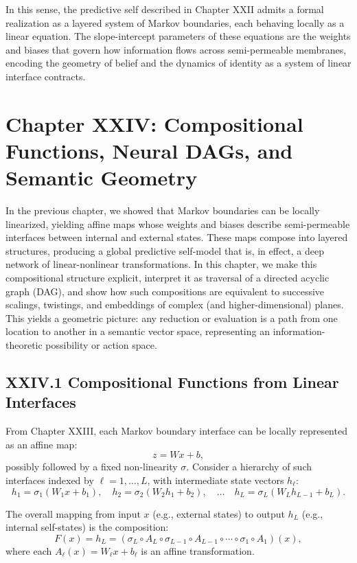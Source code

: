 \documentclass[12pt,letterpaper]{article}
\begin{document}
In this sense, the predictive self described in Chapter XXII admits a formal realization as a layered system of Markov boundaries, each behaving locally as a linear equation. The slope-intercept parameters of these equations are the weights and biases that govern how information flows across semi-permeable membranes, encoding the geometry of belief and the dynamics of identity as a system of linear interface contracts.

\newpage
\section{Chapter XXIV: Compositional Functions, Neural DAGs, and Semantic Geometry}

In the previous chapter, we showed that Markov boundaries can be locally linearized, yielding affine maps whose weights and biases describe semi-permeable interfaces between internal and external states. These maps compose into layered structures, producing a global predictive self-model that is, in effect, a deep network of linear-nonlinear transformations. In this chapter, we make this compositional structure explicit, interpret it as traversal of a directed acyclic graph (DAG), and show how such compositions are equivalent to successive scalings, twistings, and embeddings of complex (and higher-dimensional) planes. This yields a geometric picture: any reduction or evaluation is a path from one location to another in a semantic vector space, representing an information-theoretic possibility or action space.

\subsection{XXIV.1 Compositional Functions from Linear Interfaces}

From Chapter XXIII, each Markov boundary interface can be locally represented as an affine map:
\[
z = W x + b,
\]
possibly followed by a fixed non-linearity $\sigma$. Consider a hierarchy of such interfaces indexed by $\ell = 1, \dots, L$, with intermediate state vectors $h_\ell$:
\[
h_1 = \sigma_1(W_1 x + b_1), \quad
h_2 = \sigma_2(W_2 h_1 + b_2), \quad \dots \quad
h_L = \sigma_L(W_L h_{L-1} + b_L).
\]

The overall mapping from input $x$ (e.g., external states) to output $h_L$ (e.g., internal self-states) is the composition:
\[
F(x) = h_L = (\sigma_L \circ A_L \circ \sigma_{L-1} \circ A_{L-1} \circ \cdots \circ \sigma_1 \circ A_1)(x),
\]
where each $A_\ell(x) = W_\ell x + b_\ell$ is an affine transformation.
\end{document}
